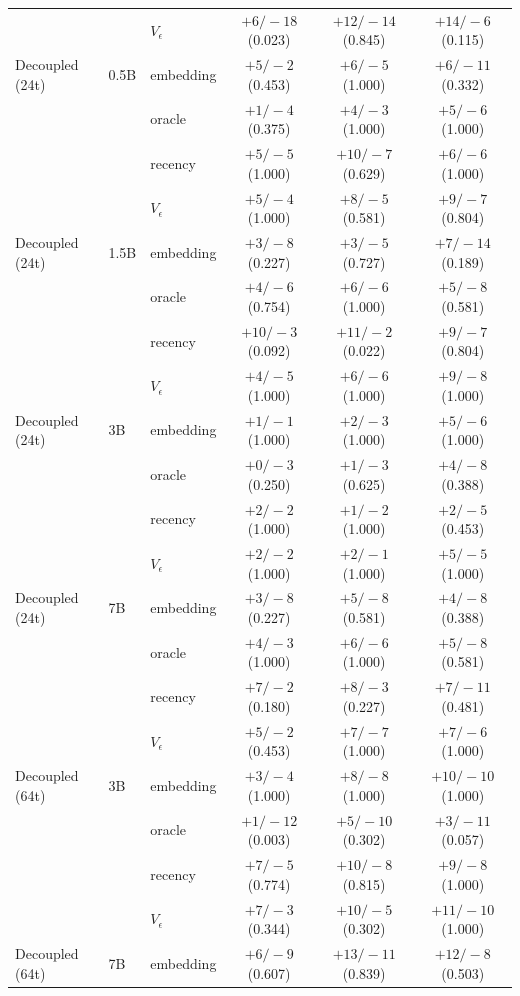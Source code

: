 {\begin{longtable}{lllccc}
 &  & $V_\epsilon$ & $+6/-18$ (0.023) & $+12/-14$ (0.845) & $+14/-6$ (0.115) \\
Decoupled (24t) & 0.5B & embedding & $+5/-2$ (0.453) & $+6/-5$ (1.000) & $+6/-11$ (0.332) \\
 &  & oracle & $+1/-4$ (0.375) & $+4/-3$ (1.000) & $+5/-6$ (1.000) \\
 &  & recency & $+5/-5$ (1.000) & $+10/-7$ (0.629) & $+6/-6$ (1.000) \\
 &  & $V_\epsilon$ & $+5/-4$ (1.000) & $+8/-5$ (0.581) & $+9/-7$ (0.804) \\
Decoupled (24t) & 1.5B & embedding & $+3/-8$ (0.227) & $+3/-5$ (0.727) & $+7/-14$ (0.189) \\
 &  & oracle & $+4/-6$ (0.754) & $+6/-6$ (1.000) & $+5/-8$ (0.581) \\
 &  & recency & $+10/-3$ (0.092) & $+11/-2$ (0.022) & $+9/-7$ (0.804) \\
 &  & $V_\epsilon$ & $+4/-5$ (1.000) & $+6/-6$ (1.000) & $+9/-8$ (1.000) \\
Decoupled (24t) & 3B & embedding & $+1/-1$ (1.000) & $+2/-3$ (1.000) & $+5/-6$ (1.000) \\
 &  & oracle & $+0/-3$ (0.250) & $+1/-3$ (0.625) & $+4/-8$ (0.388) \\
 &  & recency & $+2/-2$ (1.000) & $+1/-2$ (1.000) & $+2/-5$ (0.453) \\
 &  & $V_\epsilon$ & $+2/-2$ (1.000) & $+2/-1$ (1.000) & $+5/-5$ (1.000) \\
Decoupled (24t) & 7B & embedding & $+3/-8$ (0.227) & $+5/-8$ (0.581) & $+4/-8$ (0.388) \\
 &  & oracle & $+4/-3$ (1.000) & $+6/-6$ (1.000) & $+5/-8$ (0.581) \\
 &  & recency & $+7/-2$ (0.180) & $+8/-3$ (0.227) & $+7/-11$ (0.481) \\
 &  & $V_\epsilon$ & $+5/-2$ (0.453) & $+7/-7$ (1.000) & $+7/-6$ (1.000) \\
Decoupled (64t) & 3B & embedding & $+3/-4$ (1.000) & $+8/-8$ (1.000) & $+10/-10$ (1.000) \\
 &  & oracle & $+1/-12$ (0.003) & $+5/-10$ (0.302) & $+3/-11$ (0.057) \\
 &  & recency & $+7/-5$ (0.774) & $+10/-8$ (0.815) & $+9/-8$ (1.000) \\
 &  & $V_\epsilon$ & $+7/-3$ (0.344) & $+10/-5$ (0.302) & $+11/-10$ (1.000) \\
Decoupled (64t) & 7B & embedding & $+6/-9$ (0.607) & $+13/-11$ (0.839) & $+12/-8$ (0.503) \\

\end{longtable}}
